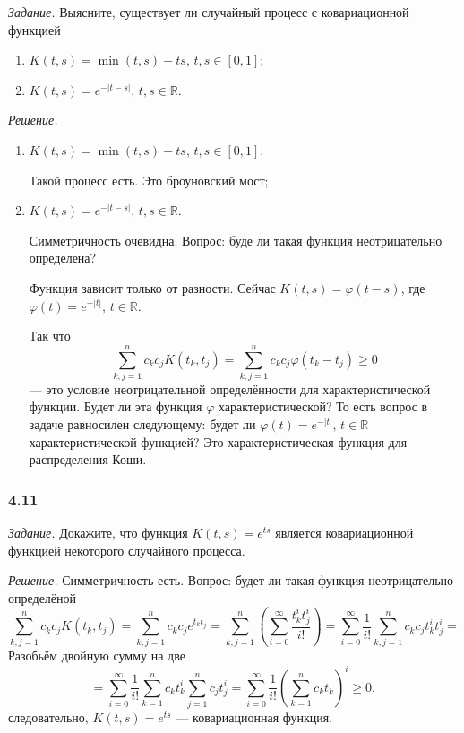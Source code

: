 \textit{Задание.}
Выясните, существует ли случайный процесс с ковариационной функцией
\begin{enumerate}[label=\alph*)]
  \item $K \left( t, s \right) = \min \left( t, s \right) - ts, \, t, s \in \left[ 0, 1 \right] $;
  \item $K \left( t, s \right) = e^{- \left| t - s \right| }, \, t, s \in \mathbb{R}$.
\end{enumerate}

\textit{Решение.}
\begin{enumerate}[label=\alph*)]
  \item $K \left( t, s \right) = \min \left( t, s \right) - ts, \, t, s \in \left[ 0, 1 \right] $.

  Такой процесс есть.
  Это броуновский мост;
  \item $K \left( t, s \right) = e^{- \left| t - s \right| }, \, t, s \in \mathbb{R}$.

  Симметричность очевидна.
  Вопрос: буде ли такая функция неотрицательно определена?

  Функция зависит только от разности.
  Сейчас $K \left( t, s \right) = \varphi \left( t - s \right) $,
  где $ \varphi \left( t \right) = e^{-\left| t \right| }, \, t \in \mathbb{R}$.

  Так что
  $$ \sum \limits_{k, j = 1}^n c_k c_j K \left( t_k, t_j \right) =
    \sum \limits_{k, j = 1}^n c_k c_j \varphi \left( t_k - t_j \right) \geq
    0$$
  --- это условие неотрицательной определённости для характеристической функции.
  Будет ли эта функция $ \varphi $ характеристической?
  То есть вопрос в задаче равносилен следующему:
  будет ли $ \varphi \left( t \right) = e^{-\left| t \right| }, \, t \in \mathbb{R}$
  характеристической функцией?
  Это характеристическая функция для распределения Коши.
\end{enumerate}

\subsubsection*{4.11}

\textit{Задание.}
Докажите, что функция $K \left( t, s \right) = e^{ts}$
является ковариационной функцией некоторого случайного процесса.

\textit{Решение.}
Симметричность есть.
Вопрос: будет ли такая функция неотрицательно определёной
$$ \sum \limits_{k, j = 1}^n c_k c_j K \left( t_k, t_j \right) =
  \sum \limits_{k, j = 1}^n c_k c_j e^{t_k t_j} =
  \sum \limits_{k, j = 1}^n \left( \sum \limits_{i = 0}^{ \infty } \frac{t_k^i t_j^i}{i!} \right) =
  \sum \limits_{i = 0}^{ \infty } \frac{1}{i!} \sum \limits_{k, j = 1}^n c_k c_j t_k^i t_j^i =$$
Разобьём двойную сумму на две
$$= \sum \limits_{i = 0}^{ \infty } \frac{1}{i!} \sum \limits_{k = 1}^n c_k t_k^i
  \sum \limits_{j = 1}^n c_j t_j^i =
  \sum \limits_{i = 0}^{ \infty } \frac{1}{i!} \left( \sum \limits_{k = 1}^n c_k t_k \right)^i \geq
  0,$$
следовательно, $K \left( t, s \right) = e^{ts}$ --- ковариационная функция.

